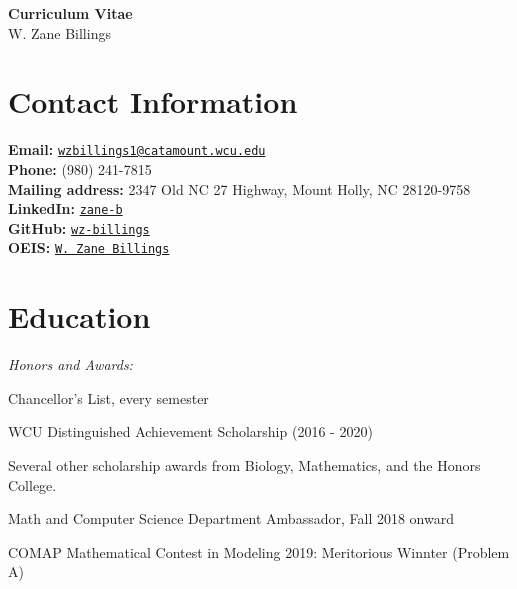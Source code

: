\documentclass[10pt]{moderncv}
\begin{document}
\begin{center}
{\Huge \textbf{Curriculum Vitae}} \\
\vspace{0.25in}
{\Large W. Zane Billings}
\end{center}

\vspace{-0.25in}

\section{Contact Information}
\textbf{Email:} \texttt{\href{mailto:wzbillings1@catamount.wcu.edu}{wzbillings1@catamount.wcu.edu}} \\
\textbf{Phone:} (980) 241-7815 \\
\textbf{Mailing address:} 2347 Old NC 27 Highway, Mount Holly, NC 28120-9758 \\
\textbf{LinkedIn:} \texttt{\href{https://www.linkedin.com/in/zane-b/}{zane-b}} \\
\textbf{GitHub:} \texttt{\href{https://github.com/wz-billings}{wz-billings}} \\
\textbf{OEIS:} \texttt{\href{https://oeis.org/A319302}{W. Zane Billings}}

\section{Education}

\textit{Honors and Awards:}
\begin{itemize} \small{
    \item Chancellor's List, every semester
    \item WCU Distinguished Achievement Scholarship (2016 - 2020)
    \item Several other scholarship awards from Biology, Mathematics, and the Honors College.
    \item Math and Computer Science Department Ambassador, Fall 2018 onward
    \item COMAP Mathematical Contest in Modeling 2019: Meritorious Winnter (Problem A)}
\end{itemize}
\end{document}
